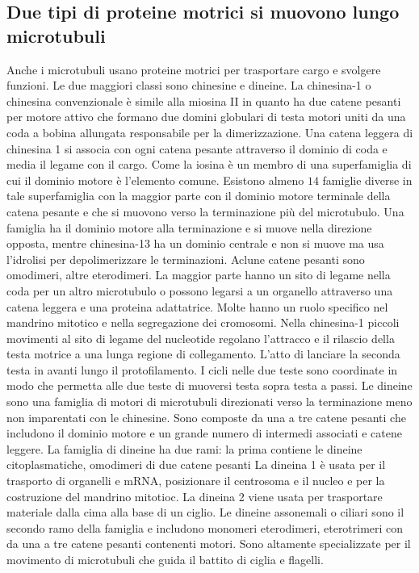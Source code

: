 \subsection{Due tipi di proteine motrici si muovono lungo microtubuli}
Anche i microtubuli usano proteine motrici per trasportare cargo e svolgere funzioni. Le due maggiori classi sono chinesine e dineine. La chinesina-1 o chinesina convenzionale \`e simile
alla miosina II in quanto ha due catene pesanti per motore attivo che formano due domini globulari di testa motori uniti da una coda a bobina allungata responsabile per la 
dimerizzazione. Una catena leggera di chinesina 1 si associa con ogni catena pesante attraverso il dominio di coda e media il legame con il cargo. Come la iosina \`e un membro di una
superfamiglia di cui il dominio motore \`e l'elemento comune. Esistono almeno $14$ famiglie diverse in tale superfamiglia con la maggior parte con il dominio motore  terminale
della catena pesante e che si muovono verso la terminazione pi\`u del microtubulo. Una famiglia ha il dominio motore alla terminazione  e si muove nella direzione opposta, mentre
chinesina-13 ha un dominio centrale e non si muove ma usa l'idrolisi per depolimerizzare le terminazioni. Aclune catene pesanti sono omodimeri, altre eterodimeri. La maggior parte
hanno un sito di legame nella coda per un altro microtubulo o possono legarsi a un organello attraverso una catena leggera e una proteina adattatrice. Molte hanno un ruolo specifico 
nel mandrino mitotico e nella segregazione dei cromosomi. Nella chinesina-1 piccoli movimenti al sito di legame del nucleotide regolano l'attracco e il rilascio della testa motrice a 
una lunga regione di collegamento. L'atto di lanciare la seconda testa in avanti lungo il protofilamento. I cicli nelle due teste sono coordinate in modo che permetta alle due teste di 
muoversi testa sopra testa a passi. Le dineine sono una famiglia di motori di microtubuli direzionati verso la terminazione meno non imparentati con le chinesine. Sono composte da una
a tre catene pesanti che includono il dominio motore e un grande numero di intermedi associati e catene leggere. La famiglia di dineine ha due rami: la prima contiene le dineine 
citoplasmatiche, omodimeri di due catene pesanti La dineina 1 \`e usata per il trasporto di organelli e mRNA, posizionare il centrosoma e il nucleo e per la costruzione del mandrino
mitotioc. La dineina 2 viene usata per trasportare materiale dalla cima alla base di un ciglio. Le dineine assonemali o ciliari sono il secondo ramo della famiglia e includono monomeri
eterodimeri, eterotrimeri con da una a tre catene pesanti contenenti motori. Sono altamente specializzate per il movimento di microtubuli che guida il battito di ciglia e flagelli. 
